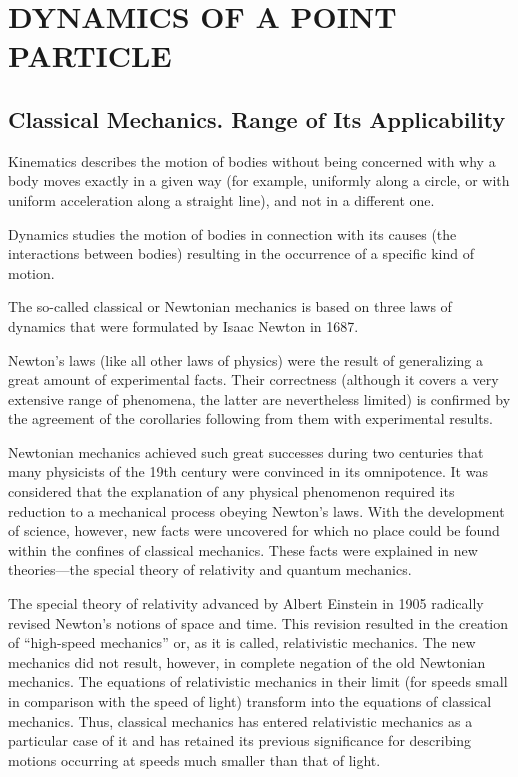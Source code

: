 

\chapter{DYNAMICS OF A POINT PARTICLE}\label{chap:2}

\section{Classical Mechanics. Range of Its Applicability}\label{sec:2_1}

Kinematics describes the motion of bodies without being concerned with why a body moves exactly in a given way (for example, uniformly along a circle, or with uniform acceleration along a straight line), and not in a different one. 

Dynamics studies the motion of bodies in connection with its causes (the interactions between bodies) resulting in the occurrence of a specific kind of motion.

The so-called classical or Newtonian mechanics is based on three laws of dynamics that were formulated by Isaac Newton in 1687.

Newton's laws (like all other laws of physics) were the result of generalizing a great amount of experimental facts. Their correctness (although it covers a very extensive range of phenomena, the latter are nevertheless limited) is confirmed by the agreement of the corollaries following from them with experimental results.

Newtonian mechanics achieved such great successes during two centuries that many physicists of the 19th century were convinced in its omnipotence. It was considered that the explanation of any physical phenomenon required its reduction to a mechanical process obeying Newton's laws. With the development of science, however, new facts were uncovered for which no place could be found within the confines of classical mechanics. These facts were explained in new theories---the special theory of relativity and quantum mechanics.

The special theory of relativity advanced by Albert Einstein in 1905 radically revised Newton's notions of space and time. This revision resulted in the creation of ``high-speed mechanics'' or, as it is called, relativistic mechanics. The new mechanics did not result, however, in complete negation of the old Newtonian mechanics. The equations of relativistic mechanics in their limit (for speeds small in comparison with the speed of light) transform into the equations of classical mechanics. Thus, classical mechanics has entered relativistic mechanics as a particular case of it and has retained its previous significance for describing motions occurring at speeds much smaller than that of light.

